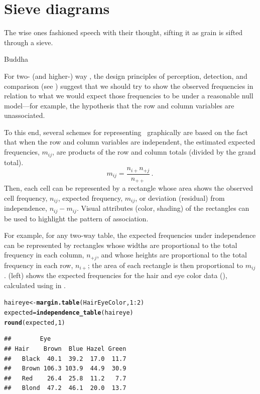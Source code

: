 \documentclass[11pt]{book}\usepackage[]{graphicx}\usepackage[]{color}
\makeatletter
\newcommand{\hlnum}[1]{\textcolor[rgb]{0.686,0.059,0.569}{#1}}%
\newcommand{\hlopt}[1]{\textcolor[rgb]{0,0,0}{#1}}%
\newcommand{\hlstd}[1]{\textcolor[rgb]{0.345,0.345,0.345}{#1}}%
\newcommand{\hlkwb}[1]{\textcolor[rgb]{0.69,0.353,0.396}{#1}}%
\newcommand{\hlkwd}[1]{\textcolor[rgb]{0.737,0.353,0.396}{\textbf{#1}}}%
\newenvironment{kframe}{%
 \def\at@end@of@kframe{}%
 \ifinner\ifhmode%
  \def\at@end@of@kframe{\end{minipage}}%
  \begin{minipage}{\columnwidth}%
 \fi\fi%
 \def\FrameCommand##1{\hskip\@totalleftmargin \hskip-\fboxsep
 \colorbox{shadecolor}{##1}\hskip-\fboxsep
     \hskip-\linewidth \hskip-\@totalleftmargin \hskip\columnwidth}%
 \MakeFramed {\advance\hsize-\width
   \@totalleftmargin\z@ \linewidth\hsize
   \@setminipage}}%
 {\par\unskip\endMakeFramed%
 \at@end@of@kframe}
\newenvironment{knitrout}{}{} %
\renewenvironment{knitrout}{\small\renewcommand{\baselinestretch}{.85}}{} %
\makeatother
\begin{document}
\section{Sieve diagrams}\label{sec:twoway-sieve}

\epigraph{The wise ones fashioned speech with their thought, sifting it as grain is sifted through a sieve.}{Buddha}
For two- (and higher-) way \ctabs, the
design principles of 
perception, detection, and comparison
(see )
suggest that we should try to show the observed frequencies
in relation to what we would expect those frequencies to be
under a reasonable null model---for example, the
hypothesis that the row and column variables are unassociated.

To this end, several schemes for representing \ctabs\
graphically are
based on the fact that when the row and column variables are
independent, the estimated expected frequencies, \(m_{ij}\), are
products of the row and column totals (divided by the grand total).
\begin{equation*}
 m_{ij} = \frac{ n_{i+} n_{+j} } { n_{++} }
 \period
\end{equation*}
Then, each cell can be represented by a rectangle whose area shows
the observed cell frequency, \(n_{ij}\),  expected frequency, \(m_{ij}\),
or deviation (residual) from independence, \(n_{ij} - m_{ij}\).
Visual attributes (color, shading) of the rectangles can be used to
highlight the pattern of association.


For example, for any two-way table, the expected frequencies under independence
can be represented by rectangles whose widths are proportional to the
total frequency in each column, \(n_{+j}\), and whose heights are
proportional to the total frequency in each row, \(n_{i+}\); the area
of each rectangle is then proportional to \(m_{ij}\).  (left)
shows the expected frequencies for the hair and eye color
data (), calculated using
 in .
\begin{knitrout}
\color{fgcolor}\begin{kframe}
\begin{alltt}
\hlstd{haireye} \hlkwb{<-} \hlkwd{margin.table}\hlstd{(HairEyeColor,} \hlnum{1}\hlopt{:}\hlnum{2}\hlstd{)}
\hlstd{expected} \hlkwb{=} \hlkwd{independence_table}\hlstd{(haireye)}
\hlkwd{round}\hlstd{(expected,} \hlnum{1}\hlstd{)}
\end{alltt}
\begin{verbatim}
##        Eye
## Hair    Brown  Blue Hazel Green
##   Black  40.1  39.2  17.0  11.7
##   Brown 106.3 103.9  44.9  30.9
##   Red    26.4  25.8  11.2   7.7
##   Blond  47.2  46.1  20.0  13.7
\end{verbatim}
\end{kframe}
\end{knitrout}
\end{document}
